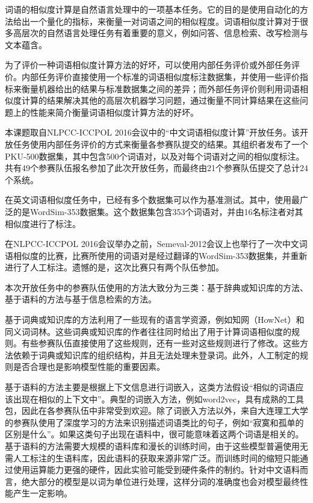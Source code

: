 
词语的相似度计算是自然语言处理中的一项基本任务。它的目的是使用自动化的方法给出一个量化的指标，来衡量一对词语之间的相似程度。词语相似度计算对于很多高层次的自然语言处理任务有着重要的意义，例如问答、信息检索、改写检测与文本蕴含。

为了评价一种词语相似度计算方法的好坏，可以使用内部任务评价或外部任务评价。内部任务评价直接使用一个标准的词语相似度标注数据集，并使用一些评价指标来衡量机器给出的结果与标准数据集之间的差异；而外部任务评价则利用词语相似度计算的结果解决其他的高层次机器学习问题，通过衡量不同计算结果在这些问题上的性能来简介衡量词语相似度计算方法的好坏。

本课题取自NLPCC-ICCPOL 2016会议中的“中文词语相似度计算”开放任务。该开放任务使用内部任务评价的方式来衡量各参赛队提交的结果。其组织者发布了一个PKU-500数据集，其中包含500个词语对，以及对每个词语对之间的相似度标注。共有49个参赛队伍报名参加了此次开放任务，而最终由21个参赛队伍提交了总计24个系统。

在英文词语相似度任务中，已经有多个数据集可以作为基准测试。其中，使用最广泛的是WordSim-353数据集。这个数据集包含353个词语对，并由16名标注者对其相似度进行了标注。

在NLPCC-ICCPOL 2016会议举办之前，Semeval-2012会议上也举行了一次中文词语相似度的比赛，比赛所使用的词语对是经过翻译的WordSim-353数据集，并重新进行了人工标注。遗憾的是，这次比赛只有两个队伍参加。

本次开放任务中的参赛队伍使用的方法大致分为三类：基于辞典或知识库的方法、基于语料的方法与基于信息检索的方法。

基于词典或知识库的方法利用了一些现有的语言学资源，例如知网（HowNet）和同义词词林。这些词典或知识库的作者往往同时给出了用于计算词语相似度的规则。有些参赛队伍直接使用了这些规则，还有一些对这些规则进行了修改。这些方法依赖于词典或知识库的组织结构，并且无法处理未登录词。此外，人工制定的规则是否合理也是影响模型性能的重要因素。

基于语料的方法主要是根据上下文信息进行词嵌入，这类方法假设“相似的词语应该出现在相似的上下文中”。典型的词嵌入方法，例如word2vec，具有成熟的工具包，因此在各参赛队伍中非常受到欢迎。除了词嵌入方法以外，来自大连理工大学的参赛队使用了深度学习的方法来识别描述词语类比的句子，例如“寂寞和孤单的区别是什么”。如果这类句子出现在语料中，很可能意味着这两个词语是相关的。基于语料的方法需要大规模的语料库和漫长的训练时间，由于这些模型普遍使用无需人工标注的生语料库，因此语料的获取来源非常广泛。而训练时间的缩短只能通过使用运算能力更强的硬件，因此实验可能受到硬件条件的制约。针对中文语料而言，绝大部分的模型是以词为单位进行处理，这样分词的准确度也会对模型最终性能产生一定影响。

